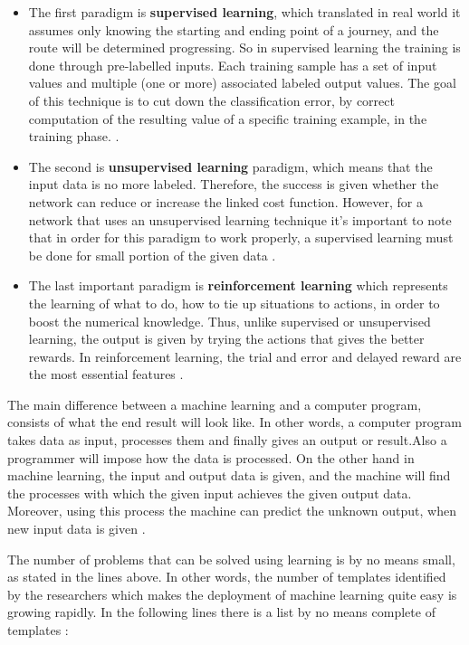 \begin{itemize}
    \item The first paradigm is \textbf{supervised learning}, which translated in real world it assumes only knowing the starting and ending point of a journey, and the route will be determined progressing. So in supervised learning the training is done through pre-labelled inputs. Each training sample has a set of input values and multiple (one or more) associated labeled output values. The goal of this technique is to cut down the classification error, by correct computation of the resulting value of a specific training example, in the training phase. \cite{IntroCNN}.

    \item The second is \textbf{unsupervised learning} paradigm, which means that the input data is no more labeled. Therefore, the success is given whether the network can reduce or increase the linked cost function. However, for a network that uses an unsupervised learning technique it's important to note that in order for this paradigm to work properly, a supervised learning must be done for small portion of the given data \cite{IntroCNN}.  
    \item The last important paradigm is \textbf{reinforcement learning} which represents the learning of what to do, how to tie up situations to actions, in order to boost the numerical knowledge. Thus, unlike supervised or unsupervised learning, the output is given by trying the actions that gives the better rewards. In reinforcement learning, the trial and error and delayed reward are the most essential features \cite{Reinforcement}. 
\end{itemize}

The main difference between a machine learning and a computer program, consists of what the end result will look like. In other words, a computer program takes data as input, processes them and finally gives an output or result.Also a programmer will impose how the data is processed. On the other hand in machine learning, the input and output data is given, and the machine will find the processes with which the given input achieves the given output data. Moreover, using this process the machine can predict the unknown output, when new input data is given \cite{ANNBasic}.

The number of problems that can be solved using learning is by no means small, as stated in the lines above. In other words, the number of templates identified by the researchers which makes the deployment of machine learning quite easy is growing rapidly. In the following lines there is a list by no means complete of templates \cite{MLIntro}:


